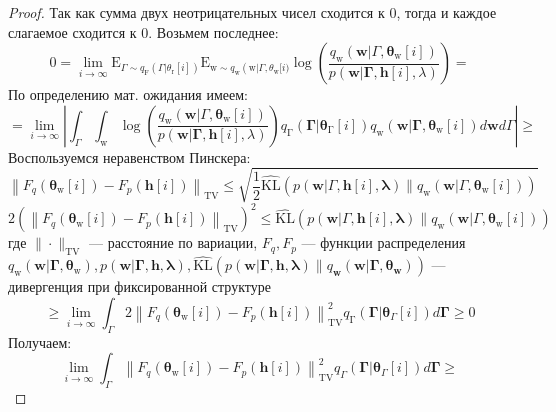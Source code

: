 \documentclass[12pt]{article}
\numberwithin{equation}{section}
\begin{document}
\begin{proof}
	Так как сумма двух неотрицательных чисел сходится к 0, тогда и каждое слагаемое сходится к 0. Возьмем последнее:
	$$0 = \lim _{i \rightarrow \infty} \mathrm{E}_{\Gamma \sim q_{\mathrm{F}}\left(\Gamma | \theta_{\mathrm{r}}[i]\right) }\mathrm{E}_{\mathrm{w} \sim q_{\mathrm{w}}\left(\mathrm{w} | \Gamma, \theta_{\mathrm{w}}[i)\right.} \log \left(\frac{q_{\mathrm{w}}\left(\mathbf{w} | \Gamma, \boldsymbol{\theta}_{\mathrm{w}}[i]\right)}{p(\mathbf{w} | \mathbf{\Gamma}, \mathbf{h}[i], \lambda)}\right) = $$
	По определению мат. ожидания имеем:
	$$ = \lim _{i \rightarrow \infty}\left|\int_{\Gamma} \int_{\mathrm{w}} \log \left(\frac{q_{\mathrm{w}}\left(\mathbf{w} | \Gamma, \boldsymbol{\theta}_{\mathrm{w}}[i]\right)}{p(\mathbf{w} | \mathbf{\Gamma}, \mathbf{h}[i], \lambda)}\right) q_{\mathrm{\Gamma}}\left(\mathbf{\Gamma} | \boldsymbol{\theta}_{\mathrm{\Gamma}}[i]\right) q_{\mathrm{w}}\left(\mathbf{w} | \mathbf{\Gamma}, \boldsymbol{\theta}_{\mathrm{w}}[i]\right) d \mathbf{w} d \Gamma\right| \geq $$
	Воспользуемся неравенством Пинскера:
	$$\left\|F_{q}\left(\boldsymbol{\theta}_{\mathrm{w}}[i]\right)-F_{p}(\mathbf{h}[i])\right\|_{\mathrm{TV}} \leq \sqrt{\frac{1}{2} \widehat{\mathrm{KL}}\left(p(\mathbf{w} | \Gamma, \mathbf{h}[i], \boldsymbol{\lambda}) \| q_{\mathrm{w}}\left(\mathbf{w} | \Gamma, \boldsymbol{\theta}_{\mathrm{w}}[i]\right)\right)}$$
	$$2\left(\left\|F_{q}\left(\boldsymbol{\theta}_{\mathrm{w}}[i]\right)-F_{p}(\mathbf{h}[i])\right\|_{\mathrm{TV}}\right)^2
	\leq  \widehat{\mathrm{KL}}\left(p(\mathbf{w} | \Gamma, \mathbf{h}[i], \boldsymbol{\lambda}) \| q_{\mathrm{w}}\left(\mathbf{w} | \Gamma, \boldsymbol{\theta}_{\mathrm{w}}[i]\right)\right)$$
	где $\|\cdot\|_{\mathrm{TV}}$ --- расстояние по вариации, $F_{q}, F_{p}$ --- функции распределения $q_{\mathrm{w}}\left(\mathbf{w} | \mathbf{\Gamma}, \boldsymbol{\theta}_{\mathrm{w}}\right), p(\mathbf{w} | \mathbf{\Gamma}, \mathbf{h}, \boldsymbol{\lambda}), \widehat{\mathrm{KL}}\left(p(\mathbf{w} | \mathbf{\Gamma}, \mathbf{h}, \boldsymbol{\lambda}) \| q_{\mathbf{w}}\left(\mathbf{w} | \mathbf{\Gamma}, \boldsymbol{\theta}_{\mathbf{w}}\right)\right)$ --- дивергенция при фиксированной структуре
	$$\geq \lim _{i \rightarrow \infty} \int_{\Gamma}2\left\|F_{q}\left(\boldsymbol{\theta}_{\mathrm{w}}[i]\right)-F_{p}(\mathbf{h}[i])\right\|_{\mathrm{TV}}^{2} q_{\mathrm{\Gamma}}\left(\boldsymbol{\Gamma} | \boldsymbol{\theta}_{\Gamma}[i]\right) d \boldsymbol{\Gamma} \geq 0$$
	Получаем:
	$$\lim _{i \rightarrow \infty} \int_{\Gamma}\left\|F_{q}\left(\boldsymbol{\theta}_{\mathrm{w}}[i]\right)-F_{p}(\mathbf{h}[i])\right\|_{\mathrm{TV}}^{2} q_{\Gamma}\left(\boldsymbol{\Gamma} | \boldsymbol{\theta}_{\Gamma}[i]\right) d \boldsymbol{\Gamma}\geq$$

\end{proof}
\end{document}
